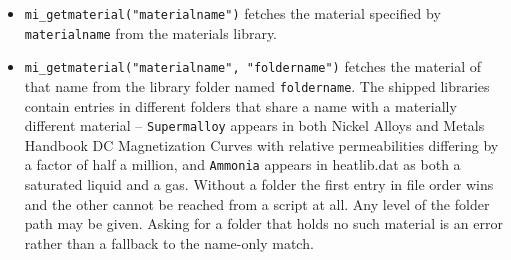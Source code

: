 \begin{itemize}
\item \texttt{mi\_getmaterial("materialname")} fetches the material specified by \texttt{materialname}
from the materials library.

\item \texttt{mi\_getmaterial("materialname", "foldername")} fetches the
material of that name from the library folder named \texttt{foldername}.
The shipped libraries contain entries in different folders that share a
name with a materially different material -- \texttt{Supermalloy} appears
in both Nickel Alloys and Metals Handbook DC Magnetization Curves with
relative permeabilities differing by a factor of half a million, and
\texttt{Ammonia} appears in heatlib.dat as both a saturated liquid and a
gas. Without a folder the first entry in file order wins and the other
cannot be reached from a script at all. Any level of the folder path may
be given. Asking for a folder that holds no such material is an error
rather than a fallback to the name-only match.


\end{itemize}
